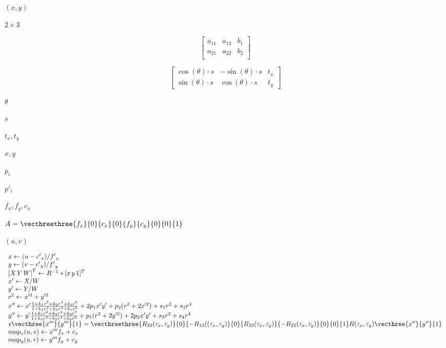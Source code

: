 \documentclass{article}
\begin{document}
$(x,y)$
\pagebreak

$2 \times 3$
\pagebreak

\[ \begin{bmatrix} a_{11} & a_{12} & b_1\\ a_{21} & a_{22} & b_2\\ \end{bmatrix} \]
\pagebreak

\[ \begin{bmatrix} \cos(\theta) \cdot s & -\sin(\theta) \cdot s & t_x \\ \sin(\theta) \cdot s & \cos(\theta) \cdot s & t_y \end{bmatrix} \]
\pagebreak

$ \theta $
\pagebreak

$ s $
\pagebreak

$ t_x, t_y $
\pagebreak

$ x, y $
\pagebreak

$p_i$
\pagebreak

$p'_i$
\pagebreak

$f_x, f_y, c_x$
\pagebreak

$A = \vecthreethree{f_x}{0}{c_x}{0}{f_y}{c_y}{0}{0}{1}$
\pagebreak

$(u, v)$
\pagebreak

\[ \begin{array}{l} x \leftarrow (u - {c'}_x)/{f'}_x \\ y \leftarrow (v - {c'}_y)/{f'}_y \\ {[X\,Y\,W]} ^T \leftarrow R^{-1}*[x \, y \, 1]^T \\ x' \leftarrow X/W \\ y' \leftarrow Y/W \\ r^2 \leftarrow x'^2 + y'^2 \\ x'' \leftarrow x' \frac{1 + k_1 r^2 + k_2 r^4 + k_3 r^6}{1 + k_4 r^2 + k_5 r^4 + k_6 r^6} + 2p_1 x' y' + p_2(r^2 + 2 x'^2) + s_1 r^2 + s_2 r^4\\ y'' \leftarrow y' \frac{1 + k_1 r^2 + k_2 r^4 + k_3 r^6}{1 + k_4 r^2 + k_5 r^4 + k_6 r^6} + p_1 (r^2 + 2 y'^2) + 2 p_2 x' y' + s_3 r^2 + s_4 r^4 \\ s\vecthree{x'''}{y'''}{1} = \vecthreethree{R_{33}(\tau_x, \tau_y)}{0}{-R_{13}((\tau_x, \tau_y)} {0}{R_{33}(\tau_x, \tau_y)}{-R_{23}(\tau_x, \tau_y)} {0}{0}{1} R(\tau_x, \tau_y) \vecthree{x''}{y''}{1}\\ map_x(u,v) \leftarrow x''' f_x + c_x \\ map_y(u,v) \leftarrow y''' f_y + c_y \end{array} \]
\pagebreak
\end{document}
